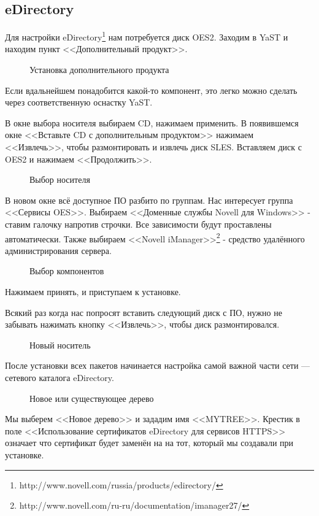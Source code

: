 \subsection{eDirectory}
Для настройки eDirectory\footnote{http://www.novell.com/russia/products/edirectory/} нам потребуется диск OES2. Заходим в YaST и находим пункт <<Дополнительный продукт>>. 
\begin{figure}[H]
\caption{Установка дополнительного продукта}
\end{figure}
Если вдальнейшем понадобится какой-то компонент, это легко можно сделать через соответственную оснастку YaST.
\clearpage

В окне выбора носителя выбираем CD, нажимаем применить. В появившемся окне <<Вставьте CD с дополнительным продуктом>> нажимаем <<Извлечь>>, чтобы размонтировать и извлечь диск SLES. Вставляем диск с OES2 и нажимаем <<Продолжить>>.
\begin{figure}[H]
\caption{Выбор носителя}
\end{figure}
\clearpage

В новом окне всё доступное ПО разбито по группам. Нас интересует группа <<Сервисы OES>>. Выбираем <<Доменные службы Novell для Windows>> - ставим галочку напротив строчки. Все зависимости будут проставлены автоматически. Также выбираем <<Novell iManager>>\footnote{http://www.novell.com/ru-ru/documentation/imanager27/} - средство удалённого администрирования сервера.
\begin{figure}[H]
\caption{Выбор компонентов}
\end{figure}
Нажимаем принять, и приступаем к установке.
\clearpage

Всякий раз когда нас попросят вставить следующий диск с ПО, нужно не забывать нажимать кнопку <<Извлечь>>, чтобы диск размонтировался.
\begin{figure}[H]
\caption{Новый носитель}
\end{figure}
\clearpage

После установки всех пакетов начинается настройка самой важной части сети --- сетевого каталога eDirectory.
\begin{figure}[H]
\caption{Новое или существующее дерево}
\end{figure}
Мы выберем <<Новое дерево>> и зададим имя <<MYTREE>>. Крестик в поле <<Использование сертификатов eDirectory для сервисов HTTPS>> означает что сертификат будет заменён на на тот, который мы создавали при установке.
\clearpage


